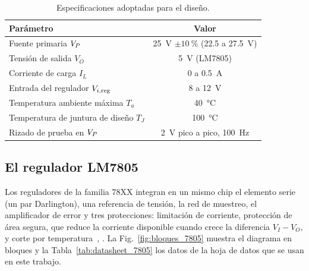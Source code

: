 \begin{table}[!htb]
\centering
\caption{Especificaciones adoptadas para el diseño.}
\label{tab:especificaciones}
\begin{tabular}{lc}
\toprule
\textbf{Parámetro} & \textbf{Valor} \\
\midrule
Fuente primaria $V_{P}$ & \SI{25}{\volt} $\pm\SI{10}{\percent}$ (\SI{22,5}{} a \SI{27,5}{\volt}) \\
Tensión de salida $V_O$ & \SI{5}{\volt} (LM7805) \\
Corriente de carga $I_L$ & \SI{0}{} a \SI{0,5}{\ampere} \\
Entrada del regulador $V_{i,\mathrm{reg}}$ & \SI{8}{} a \SI{12}{\volt} \\
Temperatura ambiente máxima $T_a$ & \SI{40}{\celsius} \\
Temperatura de juntura de diseño $T_J$ & \SI{100}{\celsius} \\
Rizado de prueba en $V_{P}$ & \SI{2}{\volt} pico a pico, \SI{100}{\hertz} \\
\bottomrule
\end{tabular}
\end{table}

\subsection{El regulador LM7805}
Los reguladores de la familia 78XX integran en un mismo chip el elemento serie (un par Darlington), una referencia de tensión, la red de muestreo, el amplificador de error y tres protecciones: limitación de corriente, protección de área segura, que reduce la corriente disponible cuando crece la diferencia $V_I - V_O$, y corte por temperatura~\cite[Sec.~6-9-1 y 6-9-2]{ap3}, \cite[Sec.~15-8.3]{coughlin}. La Fig.~\ref{fig:bloques_7805} muestra el diagrama en bloques y la Tabla~\ref{tab:datasheet_7805} los datos de la hoja de datos que se usan en este trabajo.

